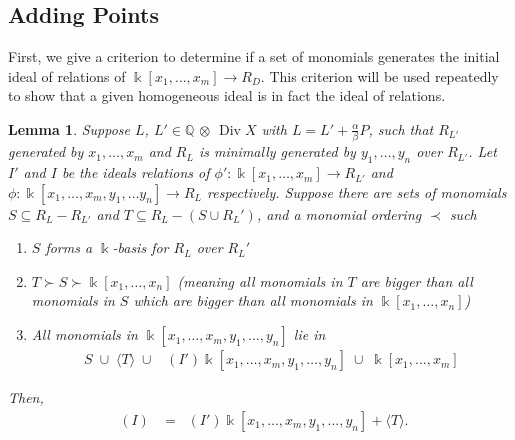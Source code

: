 \documentclass{amsart}
\theoremstyle{plain}
\newtheorem{lem}[thm]{Lemma}
\theoremstyle{definition}
\theoremstyle{remark}
\numberwithin{equation}{section}
\newcommand\ssec{\subsection}
\newcommand\BQ{{\mathbb Q}}
\newcommand\Bk{{\Bbbk}}
\DeclareMathOperator\di{Div}
\newcommand{\halfcan}{L}
\DeclareMathOperator{\initial}{in_\prec}
\begin{document}
\ssec{Adding Points}
\label{ssec:add-points}
First, we give a criterion to determine if a set of monomials generates the initial ideal of relations of $\Bk[x_1, \ldots, x_m] \to R_D$.  This criterion will be used repeatedly to show that a given homogeneous ideal is in fact the ideal of relations.


\begin{lem}
\label{lem:relations_from_generators_induction} 
Suppose $\halfcan$, $\halfcan' \in \BQ$ $\otimes$ $\di X$ with $\halfcan=\halfcan'+\frac{\alpha}{\beta}P$, such that $R_{\halfcan'}$ generated by $x_1, \ldots, x_m$
and $R_{\halfcan}$ is minimally generated by $y_1, \ldots, y_n$ over 
$R_{\halfcan'}$.  Let $I'$ and $I$ be the ideals relations of $\phi':\Bk[x_1, \ldots, x_m]\to R_{\halfcan'}$ and $\phi:\Bk[x_1, \ldots, x_m, y_1, \ldots y_n]\to R_{\halfcan}$ respectively.
Suppose there are sets of monomials $S\subseteq R_\halfcan-R_{\halfcan'}$ and $T\subseteq R_\halfcan-(S\cup R_\halfcan')$, and a monomial ordering $\prec$ such 
\begin{enumerate}
\item $S$ forms a $\Bk$-basis for $R_\halfcan$ over $R_\halfcan'$
\item $T \succ S\succ \Bk[x_1, \ldots, x_n]$ {\rm(}meaning all monomials in $T$ are bigger than all monomials in $S$ which are bigger than all monomials in $\Bk[x_1, \ldots, x_n]${\rm)}
\item All monomials in $\Bk[x_1, \ldots, x_m, y_1, \ldots, y_n]$ lie in 
\begin{align*}
	S \; \cup\; \langle T\rangle \; \cup \; \initial(I') \Bk[x_1, \ldots, x_m, y_1, \ldots, y_n] \; \cup \; \Bk[x_1, \ldots, x_m]
\end{align*}
\end{enumerate}
Then,
\begin{align*}
	\initial(I) & = \initial(I') \Bk[x_1, \ldots, x_m, y_1, \ldots, y_n]
	+ \langle T \rangle.
\end{align*}
\end{lem}
\end{document}
